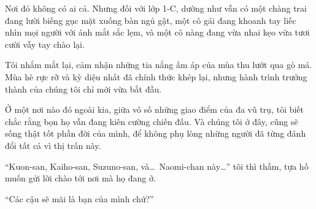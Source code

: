 \documentclass[../main.tex]{subfiles}
\begin{document}
Nơi đó không có ai cả. Nhưng đối với lớp 1-C, dường như vẫn có một chàng trai đang lười biếng gục mặt xuống bàn ngủ gật, một cô gái đang khoanh tay liếc nhìn mọi người với ánh mắt sắc lẹm, và một cô nàng đang vừa nhai kẹo vừa tươi cười vẫy tay chào lại.

Tôi nhắm mắt lại, cảm nhận những tia nắng ấm áp của mùa thu lướt qua gò má. Mùa hè rực rỡ và kỳ diệu nhất đã chính thức khép lại, nhưng hành trình trưởng thành của chúng tôi chỉ mới vừa bắt đầu.

Ở một nơi nào đó ngoài kia, giữa vô số những giao điểm của đa vũ trụ, tôi biết chắc rằng bọn họ vẫn đang kiên cường chiến đấu. Và chúng tôi ở đây, cũng sẽ sống thật tốt phần đời của mình, để không phụ lòng những người đã từng đánh đổi tất cả vì thị trấn này.

``Kuon-san, Kaiho-san, Suzuno-san, và\dots\ Naomi-chan này\dots'' tôi thì thầm, tựa hồ muốn gửi lời chào tới nơi mà họ đang ở.

\vspace{2em}
\begin{center}
  ``Các cậu sẽ mãi là bạn của mình chứ?''
\end{center}
\vspace{2em}
\end{document}
